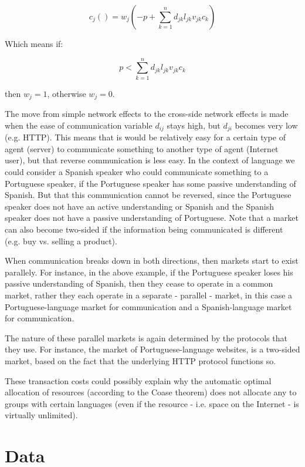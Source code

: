 \documentclass[a4paper,british]{article}\usepackage[]{graphicx}\usepackage[]{color}
\begin{document}
\begin{equation}
c_{j}()=w_{j}(-p+\sum_{k=1}^{n}d_{jk}l_{jk}v_{jk}c_{k})
\end{equation}

Which means if:

\begin{equation}
p<\sum_{k=1}^{n}d_{jk}l_{jk}v_{jk}c_{k}
\end{equation}

then $w_{j}=1$, otherwise $w_{j}=0$.

The move from simple network effects to the cross-side network effects
is made when the ease of communication variable $d_{ij}$ stays high,
but $d_{ji}$ becomes very low (e.g. HTTP). This means that is would
be relatively easy for a certain type of agent (server) to communicate
something to another type of agent (Internet user), but that reverse
communication is less easy. In the context of language we could consider
a Spanish speaker who could communicate something to a Portuguese
speaker, if the Portuguese speaker has some passive understanding
of Spanish. But that this communication cannot be reversed, since
the Portuguese speaker does not have an active understanding or Spanish
and the Spanish speaker does not have a passive understanding of Portuguese.
Note that a market can also become two-sided if the information being
communicated is different (e.g. buy vs. selling a product).

When communication breaks down in both directions, then markets start
to exist parallely. For instance, in the above example, if the Portuguese
speaker loses his passive understanding of Spanish, then they cease
to operate in a common market, rather they each operate in a separate
- parallel - market, in this case a Portuguese-language market for
communication and a Spanish-language market for communication.

The nature of these parallel markets is again determined by the protocols
that they use. For instance, the market of Portuguese-language websites,
is a two-sided market, based on the fact that the underlying HTTP
protocol functions so.

These transaction costs could possibly explain why the automatic optimal
allocation of resources (according to the Coase theorem) does not
allocate any to groups with certain languages (even if the resource
- i.e. space on the Internet - is virtually unlimited).

\section{Data}
\end{document}
